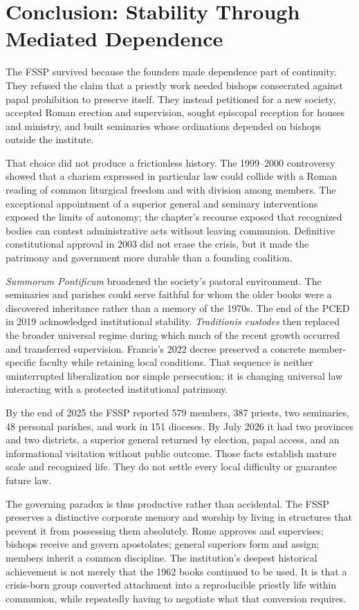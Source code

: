 \section{Conclusion: Stability Through Mediated Dependence}

The FSSP survived because the founders made dependence part of continuity. They refused the claim that a priestly work needed bishops consecrated against papal prohibition to preserve itself. They instead petitioned for a new society, accepted Roman erection and supervision, sought episcopal reception for houses and ministry, and built seminaries whose ordinations depended on bishops outside the institute.

That choice did not produce a frictionless history. The 1999--2000 controversy showed that a charism expressed in particular law could collide with a Roman reading of common liturgical freedom and with division among members. The exceptional appointment of a superior general and seminary interventions exposed the limits of autonomy; the chapter's recourse exposed that recognized bodies can contest administrative acts without leaving communion. Definitive constitutional approval in 2003 did not erase the crisis, but it made the patrimony and government more durable than a founding coalition.

\emph{Summorum Pontificum} broadened the society's pastoral environment. The seminaries and parishes could serve faithful for whom the older books were a discovered inheritance rather than a memory of the 1970s. The end of the PCED in 2019 acknowledged institutional stability. \emph{Traditionis custodes} then replaced the broader universal regime during which much of the recent growth occurred and transferred supervision. Francis's 2022 decree preserved a concrete member-specific faculty while retaining local conditions. That sequence is neither uninterrupted liberalization nor simple persecution; it is changing universal law interacting with a protected institutional patrimony.

By the end of 2025 the FSSP reported 579 members, 387 priests, two seminaries, 48 personal parishes, and work in 151 dioceses. By July 2026 it had two provinces and two districts, a superior general returned by election, papal access, and an informational visitation without public outcome. Those facts establish mature scale and recognized life. They do not settle every local difficulty or guarantee future law.

The governing paradox is thus productive rather than accidental. The FSSP preserves a distinctive corporate memory and worship by living in structures that prevent it from possessing them absolutely. Rome approves and supervises; bishops receive and govern apostolates; general superiors form and assign; members inherit a common discipline. The institution's deepest historical achievement is not merely that the 1962 books continued to be used. It is that a crisis-born group converted attachment into a reproducible priestly life within communion, while repeatedly having to negotiate what that conversion requires.
